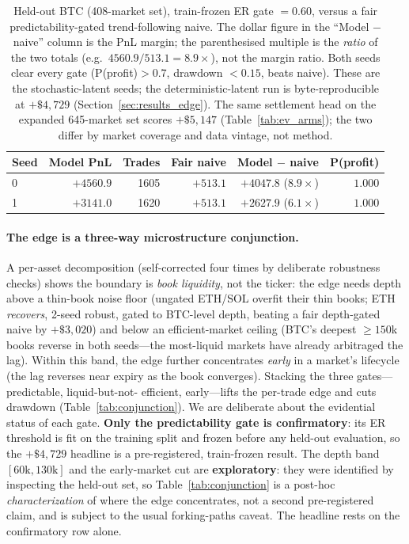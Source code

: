 \documentclass{article}
\begin{document}
\begin{table}[t]
\centering
\small
\begin{tabular}{lrrrrr}
\toprule
Seed & Model PnL & Trades & Fair naive & Model $-$ naive & P(profit) \\
\midrule
0 & $+4560.9$ & 1605 & $+513.1$ & $+4047.8$ ($8.9\times$) & $1.000$ \\
1 & $+3141.0$ & 1620 & $+513.1$ & $+2627.9$ ($6.1\times$) & $1.000$ \\
\bottomrule
\end{tabular}
\caption{Held-out BTC (408-market set), train-frozen ER gate $=0.60$,
versus a fair predictability-gated trend-following naive.  The dollar
figure in the ``Model $-$ naive'' column is the PnL margin; the
parenthesised multiple is the \emph{ratio} of the two totals (e.g.\
$4560.9/513.1 = 8.9\times$), not the margin ratio.  Both seeds clear every
gate (P(profit)$>0.7$, drawdown $<0.15$, beats naive).  These are the
stochastic-latent seeds; the deterministic-latent run is byte-reproducible
at $+\$4{,}729$ (Section~\ref{sec:results_edge}).  The same settlement head
on the expanded 645-market set scores $+\$5{,}147$
(Table~\ref{tab:ev_arms}); the two differ by market coverage and data
vintage, not method.}
\label{tab:edge}
\end{table}

\paragraph{The edge is a three-way microstructure conjunction.}
A per-asset decomposition (self-corrected four times by deliberate
robustness checks) shows the boundary is \emph{book liquidity}, not the
ticker: the edge needs depth above a thin-book noise floor (ungated
ETH/SOL overfit their thin books; ETH \emph{recovers}, 2-seed robust,
gated to BTC-level depth, beating a fair depth-gated naive by $+\$3{,}020$)
and below an efficient-market ceiling (BTC's deepest $\geq\!150$k books
reverse in both seeds---the most-liquid markets have already arbitraged
the lag).  Within this band, the edge further concentrates
\emph{early} in a market's lifecycle (the lag reverses near expiry as the
book converges).  Stacking the three gates---predictable, liquid-but-not-
efficient, early---lifts the per-trade edge and cuts drawdown
(Table~\ref{tab:conjunction}).  We are deliberate about the evidential
status of each gate.  \textbf{Only the predictability gate is
confirmatory}: its ER threshold is fit on the training split and frozen
before any held-out evaluation, so the $+\$4{,}729$ headline is a
pre-registered, train-frozen result.  The depth band $[60\text{k},130\text{k}]$
and the early-market cut are \textbf{exploratory}: they were identified by
inspecting the held-out set, so Table~\ref{tab:conjunction} is a post-hoc
\emph{characterization} of where the edge concentrates, not a second
pre-registered claim, and is subject to the usual forking-paths caveat.
The headline rests on the confirmatory row alone.
\end{document}
